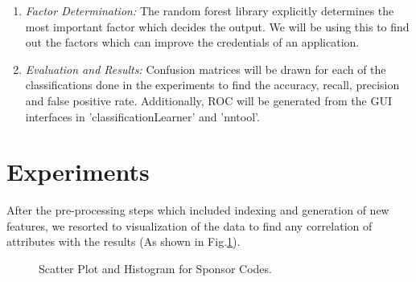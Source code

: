 \documentclass{article} %
\begin{document}
\begin{enumerate}
		\item \emph{Factor Determination:} The random forest library explicitly determines the most important factor which decides the output. We will be using this to find out the factors which can improve the credentials of an application.
		
		\item \emph{Evaluation and Results:} Confusion matrices will be drawn for each of the classifications done in the experiments to find the accuracy, recall, precision and false positive rate. Additionally, ROC will be generated from the GUI interfaces in 'classificationLearner' and 'nntool'.
		
	\end{enumerate}
	
	
	\section{Experiments}
	
	After the pre-processing steps which included indexing and generation of new features, we resorted to visualization of the data to find any correlation of attributes with the results (As shown in Fig.\ref{fig:sponsor}).
	
	\begin{figure}[h]
		\begin{center}
		\end{center}
		\caption{Scatter Plot and Histogram for Sponsor Codes.}
		\label{fig:sponsor}
	\end{figure}
	
\end{document}
